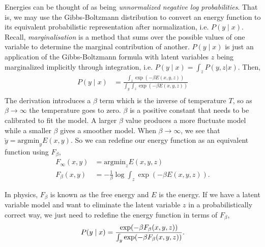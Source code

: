 \documentclass{article}
\begin{document}
Energies can be thought of as being \textit{unnormalized negative log probabilities}. That is, we may use the Gibbs-Boltzmann distribution to convert an energy function to its equivalent probabilistic representation after normalization, i.e. $P(y \mid x)$. Recall, \textit{marginalisation} is a method that sums over the possible values of one variable to determine the marginal contribution of another. $P(y \mid x)$ is just an application of the Gibbs-Boltzmann formula with latent variables $z$ being marginalized implicitly through integration, i.e. $P(y \mid x) = \int_z P(y,z | x)$. Then,
\begin{align*}
    P(y \mid x) &= \frac{ \int_z \exp(-\beta E(x,y,z)) }{ \int_y \int_z \exp(-\beta E(x, y, z))} \\
\end{align*}
The derivation introduces a $\beta$ term which is the inverse of temperature $T$, so as $\beta \rightarrow \infty$ the temperature goes to zero. $\beta$ is a positive constant that needs to be calibrated to fit the model. A larger $\beta$ value produces a more fluctuate model while a smaller $\beta$ gives a smoother model. When $\beta \rightarrow \infty$, we see that $\check{y} = \text{argmin}_{y} E(x,y)$. So we can redefine our energy function as an equivalent function using $F_\beta$,
\begin{align*}
    F_{\infty} (x,y) &= \text{argmin}_z E(x,y,z)\\
    F_{\beta} (x,y) &= -\frac{1}{\beta} \log \int_z \exp(-\beta E(x,y,z)).
\end{align*}

In physics, $F_\beta$ is known as the free energy and $E$ is the energy. If we have a latent variable model and want to eliminate the latent variable $z$ in a probabilistically correct way, we just need to redefine the energy function in terms of $F_\beta$,
\[
    P(y \mid x) = \frac{ \exp(-\beta F_\beta(x,y,z)) }{ \int_y \exp(-\beta F_\beta(x, y, z))}. \\
\]

\end{document}
